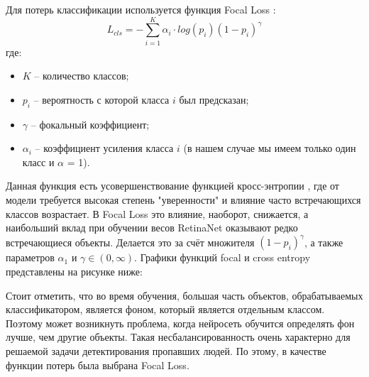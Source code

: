 Для потерь классификации используется функция Focal Loss \cite{lib-focal-loss}:
$$
L_{cls} = -\sum_{i=1}^K \alpha_i \cdot log(p_i)(1-p_i)^\gamma
$$
где:
\begin{itemize}
    \item $K$ -- количество классов;
    \item $p_i$ -- вероятность с которой класса $i$ был предсказан;
    \item $\gamma$ -- фокальный коэффициент;
    \item $\alpha_i$ -- коэффициент усиления класса $i$ (в нашем случае мы имеем только один класс и $\alpha$ = 1).
\end{itemize}

Данная функция есть усовершенствование функцией кросс-энтропии \cite{lib-focal-loss}, где от модели требуется высокая степень "уверенности" и влияние часто встречающихся классов возрастает. В Focal Loss это влияние, наоборот, снижается, а наибольший вклад при обучении весов RetinaNet оказывают редко встречающиеся объекты. Делается это за счёт множителя $(1-p_i)^\gamma$, а также параметров $\alpha_1$ и $\gamma \in(0, \infty)$. Графики функций focal и cross entropy представлены на рисунке ниже:


Стоит отметить, что во время обучения, большая часть объектов, обрабатываемых классификатором, является фоном, который является отдельным классом. Поэтому может возникнуть проблема, когда нейросеть обучится определять фон лучше, чем другие объекты. Такая несбалансированность очень характерно для решаемой задачи детектирования пропавших людей. По этому, в качестве функции потерь была выбрана Focal Loss.